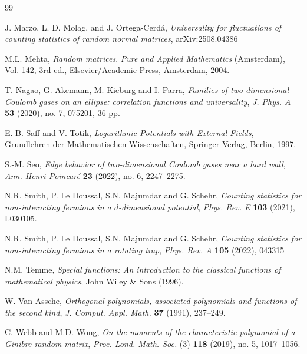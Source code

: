 \documentclass[reqno]{amsart}
\newcommand{\1}{\mathds{1}}
\numberwithin{equation}{section}
\theoremstyle{definition}
\begin{document}
\begin{thebibliography}{99}

J. Marzo, L. D. Molag, and J. Ortega-Cerd\'{a}, \emph{Universality for fluctuations of counting statistics of random normal matrices}, arXiv:2508.04386


 M.L. Mehta, \emph{Random matrices}. \textit{Pure and Applied Mathematics} (Amsterdam), Vol. 142, 3rd ed., Elsevier/Academic Press, Amsterdam, 2004.

 T. Nagao, G. Akemann, M. Kieburg and I. Parra, \emph{Families of two-dimensional Coulomb gases on an ellipse: correlation functions and universality}, \textit{J. Phys. A} \textbf{53} (2020), no. 7, 075201, 36 pp.

 E. B. Saff and V. Totik, {\em Logarithmic Potentials with External Fields},  Grundlehren der Mathematischen Wissenschaften, Springer-Verlag, Berlin, 1997.

 S.-M. Seo, \emph{Edge behavior of two-dimensional Coulomb gases near a hard wall}, \textit{Ann. Henri Poincar\'{e}} \textbf{23} (2022), no. 6, 2247--2275.



 N.R. Smith, P. Le Doussal, S.N. Majumdar and G. Schehr, \emph{Counting statistics for non-interacting fermions in a $d$-dimensional potential}, \textit{Phys. Rev. E} \textbf{103} (2021), L030105.

 N.R. Smith, P. Le Doussal, S.N. Majumdar and G. Schehr, \emph{Counting statistics for non-interacting fermions in a rotating trap}, \textit{Phys. Rev. A} \textbf{105} (2022), 043315

 N.M. Temme, \textit{Special functions: An introduction to the classical functions of mathematical physics}, John Wiley \& Sons (1996).

 W. Van Assche, \emph{Orthogonal polynomials, associated
polynomials and functions of the second kind}, \textit{J. Comput. Appl. Math.} \textbf{37} (1991), 237--249.


 C. Webb and M.D. Wong, \emph{On the moments of the characteristic polynomial of a Ginibre random matrix}, \textit{Proc. Lond. Math. Soc.} (3) \textbf{118} (2019), no. 5, 1017--1056. 




\end{thebibliography}
\end{document}
